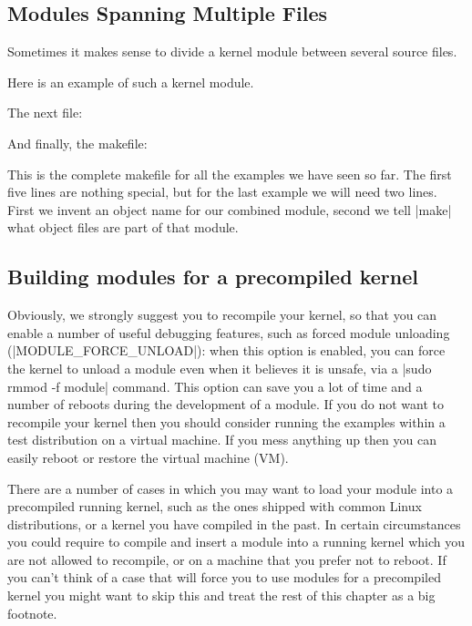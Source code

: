 \documentclass[10pt, oneside]{book}
\begin{document}
\subsection{Modules Spanning Multiple Files}
\label{modfiles}
Sometimes it makes sense to divide a kernel module between several source files.

Here is an example of such a kernel module.

The next file:

And finally, the makefile:


This is the complete makefile for all the examples we have seen so far.
The first five lines are nothing special, but for the last example we will need two lines.
First we invent an object name for our combined module, second we tell \sh|make| what object files are part of that module.

\subsection{Building modules for a precompiled kernel}
\label{precompiled}
Obviously, we strongly suggest you to recompile your kernel, so that you can enable a number of useful debugging features, such as forced module unloading (\cpp|MODULE_FORCE_UNLOAD|): when this option is enabled, you can force the kernel to unload a module even when it believes it is unsafe, via a \sh|sudo rmmod -f module| command.
This option can save you a lot of time and a number of reboots during the development of a module.
If you do not want to recompile your kernel then you should consider running the examples within a test distribution on a virtual machine.
If you mess anything up then you can easily reboot or restore the virtual machine (VM).

There are a number of cases in which you may want to load your module into a precompiled running kernel, such as the ones shipped with common Linux distributions, or a kernel you have compiled in the past.
In certain circumstances you could require to compile and insert a module into a running kernel which you are not allowed to recompile, or on a machine that you prefer not to reboot.
If you can't think of a case that will force you to use modules for a precompiled kernel you might want to skip this and treat the rest of this chapter as a big footnote.
\end{document}
